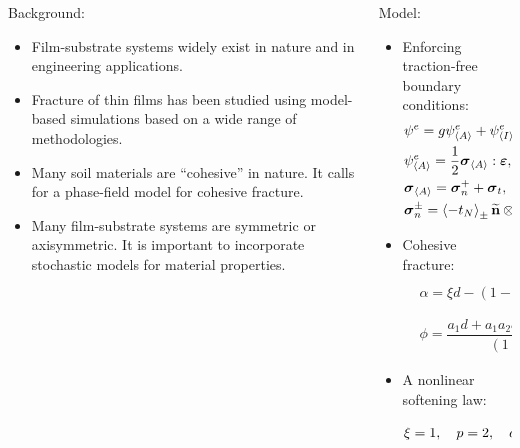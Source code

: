 \begin{frame}
\begin{columns}[T]
\begin{column}{0.5\textwidth}
      Background:
      \begin{itemize}
        \item \textcolor{peggyblue}{Film-substrate systems} widely exist in nature and in engineering applications.
        \item Fracture of thin films has been studied using model-based simulations based on a wide range of methodologies.
        \item Many soil materials are \textcolor{peggyblue}{``cohesive''} in nature. It calls for a phase-field model for cohesive fracture.
        \item Many film-substrate systems are symmetric or axisymmetric. It is important to incorporate \textcolor{peggyblue}{stochastic models} for material properties.
      \end{itemize}
    \end{column}
    \begin{column}{0.5\textwidth}
      Model:
      \begin{itemize}
        \item Enforcing traction-free boundary conditions:
              \begin{align*}
                 & \psi^e = g\psi^e_{\left< A \right>} + \psi^e_{\left< I \right>} ,                                                                                  \\
                 & \psi^e_{\left< A \right>} = \dfrac{1}{2}\boldsymbol{\sigma}_{\left< A \right>}:\boldsymbol{\varepsilon}, \quad \psi^e_{\left< I \right>} = \dfrac{1}{2}\boldsymbol{\sigma}_{\left< I \right>}:\boldsymbol{\varepsilon} , \\
                 & \boldsymbol{\sigma}_{\left< A \right>} = \boldsymbol{\sigma}_n^+ + \boldsymbol{\sigma}_t, \quad \boldsymbol{\sigma}_{\left< I \right>} = \boldsymbol{\sigma}_n^-,                                              \\
                 & \boldsymbol{\sigma}_n^\pm = \left<-t_N\right>_\pm\widetilde{\textbf{n}}\otimes\widetilde{\textbf{n}}, \quad  \boldsymbol{\sigma}_t = \boldsymbol{\sigma} - \boldsymbol{\sigma}_n^+ - \boldsymbol{\sigma}_n^-.                    
              \end{align*}
        \item Cohesive fracture:
              \begin{align*}
                 & \alpha = \xi d- (1-\xi) d^2, \quad g = \dfrac{1}{1+\phi}, \\
                 & \phi = \dfrac{a_1d + a_1a_2d^2 + a_1a_2a_3d^3}{(1-d)^p}.  
              \end{align*}
        \item A nonlinear softening law:
              \begin{align*}
                \xi = 1, \quad p = 2, \quad a_1 = \dfrac{{\mathcal{G}_c}}{c_0 l \psi_c}, \quad a_2 = 1, \quad a_3 = 0.
              \end{align*}
      \end{itemize}
    \end{column}
  \end{columns}
\end{frame}

